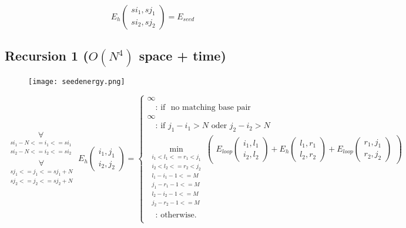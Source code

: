 \begin{equation*}
E_h(\substack{si_1,sj_1\\si_2,sj_2}) = E_{seed}
\end{equation*}

\clearpage

\subsection{Recursion 1 ($O(N^{4})$ space + time)}

\begin{figure}[H]
	\centering
	\texttt{[image: seedenergy.png]}
\end{figure}

\begin{equation*}
\substack{
  \underset{\substack{si_{1}-N <= i_{1} <= si_{1}\\si_{2}-N <= i_{2} <= si_{2}}}{\forall}\\
  \underset{\substack{sj_{1} <= j_{1} <= sj_{1}+N\\sj_{2} <= j_{2} <= sj_{2}+N}}{\forall}
}
E_h(\substack{i_1,j_1\\i_2,j_2}) = \begin{cases}
  \infty\\
  \quad\text{: if } \text{ no matching base pair }\\
  \infty\\
  \quad\text{: if } j_{1} - i_{1} > N \text{ oder } j_{2} - i_{2} > N\\
  \min\limits_{\substack{i_{1} < l_{1} <= r_{1} < j_{1}\\i_{2} < l_{2} <= r_{2} < j_{2}\\l_{1} - i_{1} - 1 <= M\\j_{1}-r_{1}-1 <= M\\l_{2} - i_{2} - 1 <= M\\j_{2}-r_{2}-1 <= M}}
  \begin{pmatrix}
	E_{loop}(\substack{i_1,l_1\\i_2,l_2}) + E_h(\substack{l_1,r_1\\l_2,r_2}) + E_{loop}(\substack{r_1,j_1\\r_2,j_2})
  \end{pmatrix}\\
  \quad\text{: otherwise.}\\
  
\end{cases}
\end{equation*}

\clearpage

